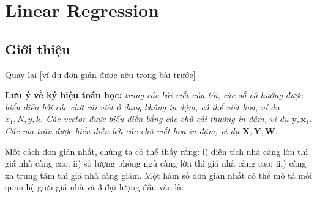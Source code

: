 \chapter{Linear Regression}
\label{cha:linearregression}
\section{Giới thiệu}
\label{sec:linearregression_-gioi-thieu}

Quay lại [ví dụ đơn giản được nêu trong bài trước]%

\textbf{Lưu ý về ký hiệu toán học:} \textit{trong các bài viết của tôi, các số vô hướng được biểu diễn bởi các chữ cái viết ở dạng không in đậm, có thể viết hoa, ví dụ $x_1, N, y, k$. Các vector được biểu diễn bằng các chữ cái thường in đậm, ví dụ $\mathbf{y}, \mathbf{x}_1 $. Các ma trận được biểu diễn bởi các chữ viết hoa in đậm, ví dụ $\mathbf{X, Y, W} $.}

Một cách đơn giản nhất, chúng ta có thể thấy rằng: i) diện tích nhà càng lớn thì giá nhà càng cao; ii) số lượng phòng ngủ càng lớn thì giá nhà càng cao; iii) càng xa trung tâm thì giá nhà càng giảm. Một hàm số đơn giản nhất có thể mô tả mối quan hệ giữa giá nhà và 3 đại lượng đầu vào là: 